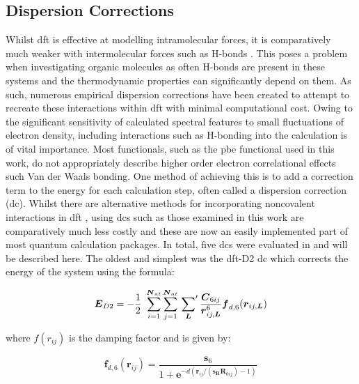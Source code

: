\subsection{Dispersion Corrections}
\label{subsec:dcs}
Whilst \acrshort{dft} is effective at modelling intramolecular forces, it is comparatively much weaker with intermolecular forces such as H\nobreakdash-bonds \cite{Kristyan2004}. This poses a problem when investigating organic molecules as often H\nobreakdash-bonds are present in these systems and the thermodynamic properties can significantly depend on them. As such, numerous empirical dispersion corrections have been created to attempt to recreate these interactions within \acrshort{dft} with minimal computational cost. Owing to the significant sensitivity of calculated spectral features to small fluctuations of electron density, including interactions such as H\nobreakdash-bonding into the calculation is of vital importance. Most functionals, such as the \acrshort{pbe} functional used in this work, do not appropriately describe higher order electron correlational effects such Van der Waals bonding. One method of achieving this is to add a correction term to the energy for each calculation step, often called a dispersion correction (\acrshort{dc}). Whilst there are alternative methods for incorporating noncovalent interactions in \acrshort{dft} \cite{Kozuch2010}, using \acrshort{dc}s such as those examined in this work are comparatively much less costly and these are now an easily implemented part of most quantum calculation packages.
In total, five \acrshort{dc}s were evaluated in  and will be described here. The oldest and simplest was the \acrshort{dft}-D2 \cite{Grimme2006} \acrshort{dc} which corrects the energy of the system using the formula:

\begin{equation}
\boldsymbol{E}_{D2} = -\frac{1}{2}\ \sum_{i=1}^{\boldsymbol{N}_{at}} \sum_{j=1}^{\boldsymbol{N}_{at}} \sideset{}{'}\sum_{\boldsymbol{L}} \frac{\boldsymbol{C}_{6ij}}{\boldsymbol{r}_{ij,\boldsymbol{L}}^6} \boldsymbol{f}_{d,6}(\boldsymbol{r}_{ij, \boldsymbol{L}}) 
\end{equation}

where \( f(r_{ij}) \) is the damping factor and is given by:

\begin{equation}
\boldsymbol{f}_{d,6}(\boldsymbol{r}_{ij}) = \frac{\boldsymbol{s}_6}{1 + \boldsymbol{e}^{-d(\boldsymbol{r}_{ij} / (\boldsymbol{s}_{\boldsymbol{R}} \boldsymbol{R}_{0ij})-1)}} 
\end{equation}


